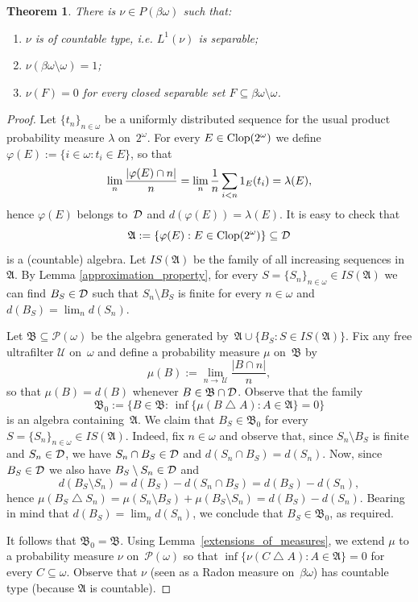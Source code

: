 \documentclass[12pt]{amsart}
\newcommand{\DD}{\protect{\mathcal D}}
\newcommand{\sm}{\setminus}
\newcommand{\sub}{\subseteq}
\def\dfrac#1#2{{\displaystyle{#1\over#2}}}
\newcommand{\alg}{\mathfrak A}
\newcommand{\algb}{\mathfrak B}
\newcommand{\PP}{{\mathcal P}}
\newcommand{\btu}{\bigtriangleup}
\newcommand{\clop}{\protect{\rm Clop} }
\newcommand{\0}{\protect{\bf 0}}
\newcommand{\1}{\protect{\bf 1}}
\newtheorem{theo}{Theorem}[section]
\theoremstyle{definition}
\theoremstyle{remark}
\numberwithin{equation}{section}
\begin{document}
\begin{theo}\label{measure_on_betaN} 
There is $\nu \in P(\beta\omega)$ such that: 
\begin{enumerate}
\item[(i)] $\nu$ is of countable type, i.e. $L^1(\nu)$ is separable;
\item[(ii)] $\nu(\beta\omega \sm \omega)=1$;
\item[(iii)] $\nu(F)=0$ for every closed separable set $F\sub \beta\omega\sm \omega$.
\end{enumerate}
\end{theo}
\begin{proof}
Let $\{t_n\}_{n\in \omega}$ be a uniformly distributed sequence for the usual product probability
measure $\lambda$ on~$2^\omega$. For every $E\in \clop(2^\omega)$ we define
$\varphi(E):=\{i\in \omega: t_i\in E\}$, so that 
$$
	\lim_{n}\dfrac{|\varphi(E) \cap n|}{n}=
	\lim_{n}\frac{1}{n}\sum_{i<n}1_{E}(t_i)=
	\lambda(E),
$$
hence $\varphi(E)$ belongs to~$\DD$ and $d(\varphi(E))=\lambda(E)$. It is easy
to check that 
$$
	\alg:=\{\varphi(E):E\in \clop(2^\omega)\} \sub \DD
$$ 
is a (countable) algebra. Let $IS(\alg)$ be the family of all increasing sequences in~$\alg$. 
By Lemma \ref{approximation_property}, for every
$S=\{S_n\}_{n\in \omega}\in IS(\alg)$ we can find $B_S\in \DD$ such that
$S_n\sm B_S$ is finite for every $n\in \omega$ and $d(B_S)=\lim_n d(S_n)$. 

Let $\algb \sub \mathcal{P}(\omega)$ be the algebra generated by~$\alg \cup \{B_S: S\in IS(\alg)\}$.
Fix any free ultrafilter $\mathcal{U}$ on~$\omega$ and
define a probability measure $\mu$ on~$\algb$ by
$$
	\mu(B) := \lim_{n\to\,\mathcal{U}}\frac{|B\cap n|}{n},
$$
so that $\mu(B)=d(B)$ whenever $B\in\algb \cap \DD$. Observe that
the family 
$$
	\algb_0:=\big\{ B\in\algb: \, \inf\{\mu(B\btu A):A\in\alg\}=0 \big\}
$$
is an algebra containing~$\alg$. We claim that 
$B_S\in \algb_0$ for every $S=\{S_n\}_{n\in \omega}\in IS(\alg)$. Indeed, fix $n\in \omega$ and observe that, since $S_n \sm B_S$ is finite
and $S_n\in \DD$, we have $S_n\cap B_S \in \DD$ and $d(S_n\cap B_S)=d(S_n)$.
Now, since $B_S\in \DD$ we also have $B_S \sm S_n\in \DD$ and
$$
	d(B_S \sm S_n)=d(B_S)-d(S_n\cap B_S)=d(B_S)-d(S_n),
$$
hence $\mu(B_S\btu S_n)=
	\mu(S_n \sm B_S)+\mu(B_S \sm S_n)=
	d(B_S)-d(S_n)$.
Bearing in mind that $d(B_S)=\lim_n d(S_n)$, we conclude that
$B_S \in \algb_0$, as required. 

It follows that $\algb_0=\algb$. Using Lemma~\ref{extensions_of_measures}, 
we extend $\mu$ to a probability measure $\nu$ on~$\PP(\omega)$ so that 
$\inf\{\nu(C\btu A):A\in\alg\}=0$ for every $C\sub \omega$. Observe that
$\nu$ (seen as a Radon measure on~$\beta\omega$) has countable type (because $\alg$ is countable).


\end{proof}
\end{document}
